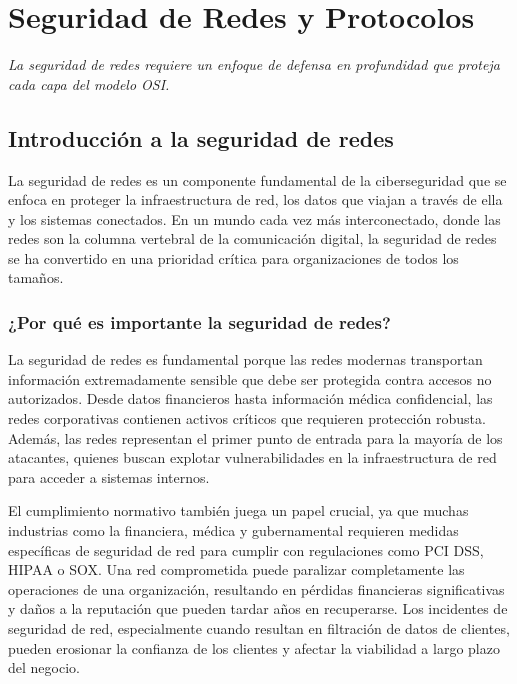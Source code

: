 \chapter{Seguridad de Redes y Protocolos}
\vspace{65px}
\begin{flushright}
    \textit{La seguridad de redes requiere un enfoque de defensa en profundidad que proteja cada capa del modelo OSI.}
\end{flushright}

\section{Introducción a la seguridad de redes}

La seguridad de redes es un componente fundamental de la ciberseguridad que se enfoca en proteger la infraestructura de red, los datos que viajan a través de ella y los sistemas conectados. En un mundo cada vez más interconectado, donde las redes son la columna vertebral de la comunicación digital, la seguridad de redes se ha convertido en una prioridad crítica para organizaciones de todos los tamaños.

\subsection{¿Por qué es importante la seguridad de redes?}

La seguridad de redes es fundamental porque las redes modernas transportan información extremadamente sensible que debe ser protegida contra accesos no autorizados. Desde datos financieros hasta información médica confidencial, las redes corporativas contienen activos críticos que requieren protección robusta. Además, las redes representan el primer punto de entrada para la mayoría de los atacantes, quienes buscan explotar vulnerabilidades en la infraestructura de red para acceder a sistemas internos.

El cumplimiento normativo también juega un papel crucial, ya que muchas industrias como la financiera, médica y gubernamental requieren medidas específicas de seguridad de red para cumplir con regulaciones como PCI DSS, HIPAA o SOX. Una red comprometida puede paralizar completamente las operaciones de una organización, resultando en pérdidas financieras significativas y daños a la reputación que pueden tardar años en recuperarse. Los incidentes de seguridad de red, especialmente cuando resultan en filtración de datos de clientes, pueden erosionar la confianza de los clientes y afectar la viabilidad a largo plazo del negocio.

